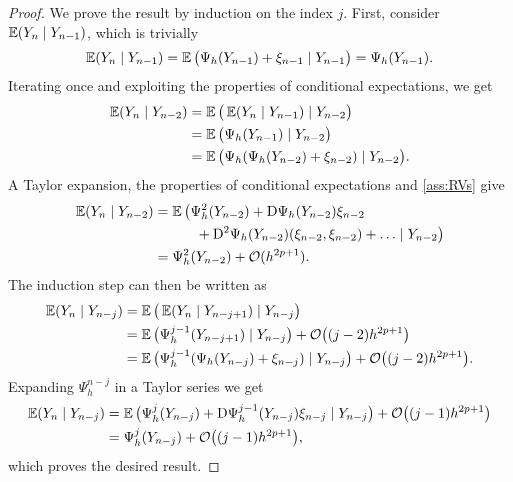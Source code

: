 \documentclass[10pt]{article}
\begin{document}
\begin{proof} We prove the result by induction on the index $j$. First, consider $\operatorname{\mathbb{E}}(Y_n \mid Y_{n-1})$, which is trivially
	\begin{equation}
		\operatorname{\mathbb{E}}(Y_n \mid Y_{n-1}) = \operatorname{\mathbb{E}}\big(\Psi_h(Y_{n-1}) + \xi_{n-1} \mid Y_{n-1}\big) = \Psi_h(Y_{n-1}).
	\end{equation}
	Iterating once and exploiting the properties of conditional expectations, we get
	\begin{equation}
	\begin{aligned}
		\operatorname{\mathbb{E}}(Y_n \mid Y_{n-2}) &= \operatorname{\mathbb{E}}\big(\operatorname{\mathbb{E}}(Y_n \mid Y_{n-1}) \mid Y_{n-2}\big) \\
		&= \operatorname{\mathbb{E}}\big(\Psi_h(Y_{n-1}) \mid Y_{n-2}\big)\\
		&= \operatorname{\mathbb{E}}\big(\Psi_h(\Psi_h(Y_{n-2}) + \xi_{n-2}) \mid Y_{n-2}\big).
	\end{aligned}
	\end{equation}
	A Taylor expansion, the properties of conditional expectations and \cref{ass:RVs} give
	\begin{equation}
	\begin{aligned}
		\operatorname{\mathbb{E}}(Y_n \mid Y_{n-2}) &= \operatorname{\mathbb{E}}\big(\Psi_h^2(Y_{n-2}) + \mathrm{D}\Psi_h(Y_{n-2})\xi_{n-2} \\
		&\quad\quad\quad + \mathrm{D}^2\Psi_h(Y_{n-2})(\xi_{n-2}, \xi_{n-2}) + \ldots \mid Y_{n-2}\big)\\
		&= \Psi_h^2(Y_{n-2}) + \mathcal{O}(h^{2p+1}).
	\end{aligned}
	\end{equation}
	The induction step can then be written as
	\begin{equation}
	\begin{aligned}
		\operatorname{\mathbb{E}}(Y_n \mid Y_{n-j}) &= \operatorname{\mathbb{E}}\big(\operatorname{\mathbb{E}}(Y_n \mid Y_{n-j+1}) \mid Y_{n-j}\big)\\
		&= \operatorname{\mathbb{E}}\big( \Psi_h^{j-1}(Y_{n-j+1}) \mid Y_{n-j}\big) + \mathcal{O}\big((j-2)h^{2p+1}\big)\\
		&= \operatorname{\mathbb{E}}\big( \Psi_h^{j-1}(\Psi_h(Y_{n-j}) + \xi_{n-j}) \mid Y_{n-j}\big) + \mathcal{O}\big((j-2)h^{2p+1}\big).
	\end{aligned}
	\end{equation}
	Expanding $\Psi_h^{n-j}$ in a Taylor series we get
	\begin{equation}
	\begin{aligned}
		\operatorname{\mathbb{E}}(Y_n \mid Y_{n-j}) &= \operatorname{\mathbb{E}}\big(\Psi_h^j(Y_{n-j}) + \mathrm{D}\Psi_h^{j-1}(Y_{n-j})\xi_{n-j} \mid Y_{n-j}\big) + \mathcal{O}\big((j-1)h^{2p+1}\big)\\
		&= \Psi_h^j(Y_{n-j}) + \mathcal{O}\big((j-1)h^{2p+1}\big),
	\end{aligned}
	\end{equation}
	which proves the desired result.
\end{proof}
\end{document}
